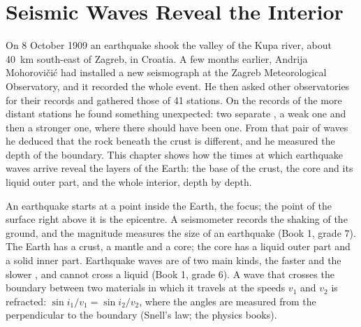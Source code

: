\chapter{Seismic Waves Reveal the Interior}\label{ch:g11:seismic-structure}

On 8 October 1909 an earthquake shook the valley of the Kupa river, about
\qty{40}{km} south-east of Zagreb, in Croatia. A few months earlier, Andrija
Mohorovičić had installed a new seismograph at the Zagreb Meteorological
Observatory, and it recorded the whole event. He then asked other
observatories for their records and gathered those of 41 stations. On the
records of the more distant stations he found something unexpected: two
separate , a weak one and then a stronger one, where there should have
been one. From that pair of waves he deduced that the rock beneath the crust
is different, and he measured the depth of the boundary. This chapter shows
how the times at which earthquake waves arrive reveal the layers of the
Earth: the base of the crust, the core and its liquid outer part, and the
whole interior, depth by depth.

\begin{recall}
An earthquake starts at a point inside the Earth, the focus; the point of
the surface right above it is the epicentre. A seismometer records the shaking
of the ground, and the magnitude measures the size of an earthquake (Book 1,
grade 7). The Earth has a crust, a mantle and a core; the core has a liquid
outer part and a solid inner part. Earthquake waves are of two main kinds,
the faster  and the slower , and  cannot cross a liquid
(Book 1, grade 6). A wave that crosses the boundary between two materials in
which it travels at the speeds $v_1$ and $v_2$ is refracted:
$\sin i_1/v_1 = \sin i_2/v_2$, where the angles are measured from the
perpendicular to the boundary (Snell's law; the physics books).
\end{recall}

